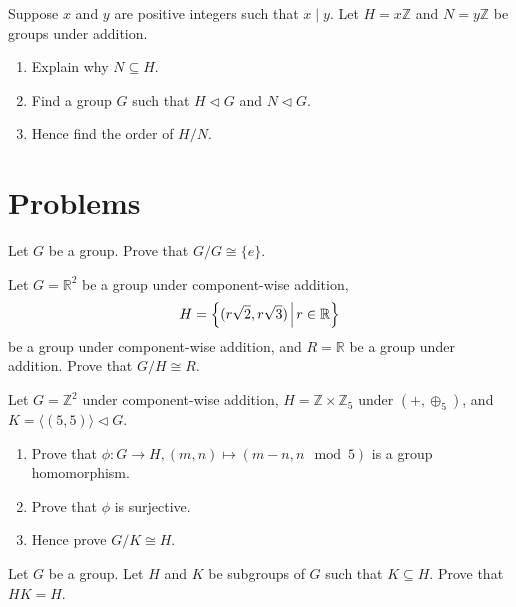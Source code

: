 \begin{exercise}
    Suppose $x$ and $y$ are positive integers such that $x\;|\;y$. Let $H = x\mathbb{Z}$ and $N = y\mathbb{Z}$ be groups under addition.
    \begin{enumerate}[label=(\roman*)]
        \item Explain why $N \subseteq H$.
        \item Find a group $G$ such that $H \lhd G$ and $N \lhd G$.
        \item Hence find the order of $H/N$.
    \end{enumerate}
\end{exercise}

\newpage

\section{Problems}
\begin{problem}
    Let $G$ be a group. Prove that $G/G \cong \{e\}$.
\end{problem}

\begin{problem}
    Let $G = \mathbb{R}^2$ be a group under component-wise addition,
    \[
        H = \left\{(r\sqrt2, r\sqrt3)\; \vline\;r\in\mathbb{R}\right\}
    \]
    be a group under component-wise addition, and $R = \mathbb{R}$ be a group under addition. Prove that $G/H \cong R$.
\end{problem}

\begin{problem}
    Let $G = \mathbb{Z}^2$ under component-wise addition, $H = \mathbb{Z} \times \mathbb{Z}_5$ under $(+, \oplus_5)$, and $K = \langle(5, 5)\rangle \lhd G$.
    \begin{enumerate}[label=(\roman*)]
        \item Prove that $\phi: G \to H, (m,n) \mapsto (m-n, n \mod 5)$ is a group homomorphism.
        \item Prove that $\phi$ is surjective.
        \item Hence prove $G/K \cong H$.
    \end{enumerate}
\end{problem}

\begin{problem}\label{problem-subgroup-product-equal-to-subgroup-if-one-is-subgroup-of-another}
    Let $G$ be a group. Let $H$ and $K$ be subgroups of $G$ such that $K \subseteq H$. Prove that $HK = H$.
\end{problem}

